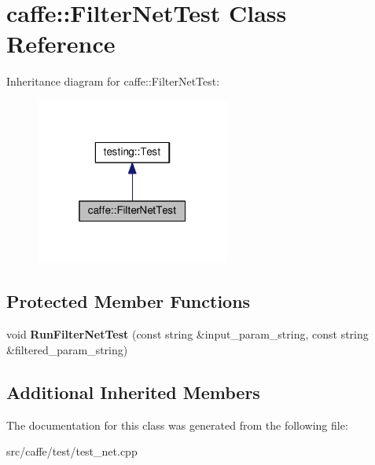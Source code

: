 \hypertarget{classcaffe_1_1_filter_net_test}{}\section{caffe\+:\+:Filter\+Net\+Test Class Reference}
\label{classcaffe_1_1_filter_net_test}


Inheritance diagram for caffe\+:\+:Filter\+Net\+Test\+:
\nopagebreak
\begin{figure}[H]
\begin{center}
\leavevmode
\includegraphics[width=181pt]{classcaffe_1_1_filter_net_test__inherit__graph}
\end{center}
\end{figure}
\subsection*{Protected Member Functions}
\begin{DoxyCompactItemize}
\item 
\mbox{\label{classcaffe_1_1_filter_net_test_a16e83d3ba32b092e1e97d21b078e33b8}} 
void {\bfseries Run\+Filter\+Net\+Test} (const string \&input\+\_\+param\+\_\+string, const string \&filtered\+\_\+param\+\_\+string)
\end{DoxyCompactItemize}
\subsection*{Additional Inherited Members}


The documentation for this class was generated from the following file\+:\begin{DoxyCompactItemize}
\item 
src/caffe/test/test\+\_\+net.\+cpp\end{DoxyCompactItemize}
